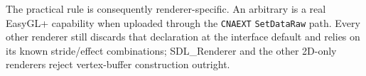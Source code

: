 The practical rule is consequently renderer-specific. An arbitrary
 is a real EasyGL+ capability when uploaded
through the \texttt{CNAEXT} \texttt{SetDataRaw} path. Every other renderer still discards that
declaration at the interface default and relies on its known stride/effect combinations;
SDL\_Renderer and the other 2D-only renderers reject vertex-buffer construction outright.
